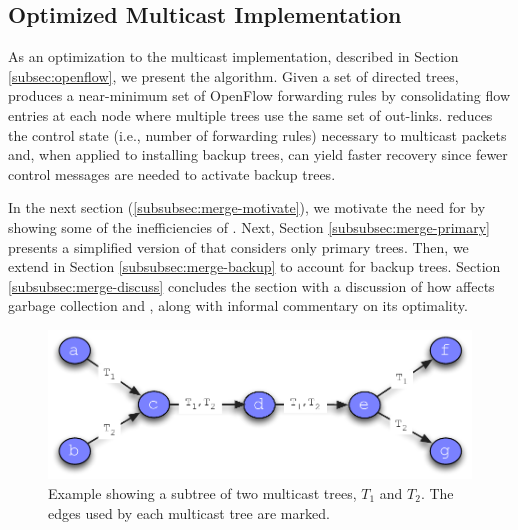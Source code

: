 
\subsection{Optimized Multicast Implementation}
\label{subsec:merge}

As an optimization to the \base multicast implementation, described in Section \ref{subsec:openflow}, we present the \merge algorithm.  
Given a set of directed trees, produces a near-minimum set of OpenFlow forwarding rules by
consolidating flow entries at each node where multiple trees use the same set of out-links.  \merge reduces the control state (i.e., number of forwarding rules) necessary to 
multicast packets and, when applied to installing backup trees, can yield faster recovery since fewer control messages are needed to activate backup trees.




In the next section (\ref{subsubsec:merge-motivate}), we motivate the need for \merge by showing some of the inefficiencies of \bases.  Next, Section \ref{subsubsec:merge-primary} 
presents a simplified version of  \merge that considers only primary trees.  Then, we extend
\merge in Section \ref{subsubsec:merge-backup} to account for backup trees.  Section \ref{subsubsec:merge-discuss} concludes the section with a discussion of how \merge affects garbage
collection and \pcnts, along with informal commentary on its optimality.

\begin{figure}
  \centering
   \includegraphics[scale=0.55]{figs/merger-example.pdf}
\caption{Example showing a subtree of two multicast trees, $T_1$ and $T_2$.  The edges used by each multicast tree are marked.}
\label{fig:merger-example}
\end{figure}


